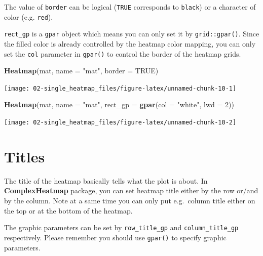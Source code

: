\documentclass[]{book}
\newenvironment{Shaded}{\begin{snugshade}}{\end{snugshade}}
\newcommand{\KeywordTok}[1]{\textcolor[rgb]{0.13,0.29,0.53}{\textbf{#1}}}
\newcommand{\DataTypeTok}[1]{\textcolor[rgb]{0.13,0.29,0.53}{#1}}
\newcommand{\DecValTok}[1]{\textcolor[rgb]{0.00,0.00,0.81}{#1}}
\newcommand{\StringTok}[1]{\textcolor[rgb]{0.31,0.60,0.02}{#1}}
\newcommand{\OtherTok}[1]{\textcolor[rgb]{0.56,0.35,0.01}{#1}}
\newcommand{\NormalTok}[1]{#1}
\theoremstyle{definition}
\theoremstyle{definition}
\theoremstyle{definition}
\theoremstyle{remark}
\begin{document}
The value of \texttt{border} can be logical (\texttt{TRUE} corresponds
to \texttt{black}) or a character of color (e.g. \texttt{red}).

\texttt{rect\_gp} is a \texttt{gpar} object which means you can only set
it by \texttt{grid::gpar()}. Since the filled color is already
controlled by the heatmap color mapping, you can only set the
\texttt{col} parameter in \texttt{gpar()} to control the border of the
heatmap grids.

\begin{Shaded}
\begin{Highlighting}[]
\KeywordTok{Heatmap}\NormalTok{(mat, }\DataTypeTok{name =} \StringTok{"mat"}\NormalTok{, }\DataTypeTok{border =} \OtherTok{TRUE}\NormalTok{)}
\end{Highlighting}
\end{Shaded}

\begin{center}\texttt{[image: 02-single\_heatmap\_files/figure-latex/unnamed-chunk-10-1]} \end{center}

\begin{Shaded}
\begin{Highlighting}[]
\KeywordTok{Heatmap}\NormalTok{(mat, }\DataTypeTok{name =} \StringTok{"mat"}\NormalTok{, }\DataTypeTok{rect_gp =} \KeywordTok{gpar}\NormalTok{(}\DataTypeTok{col =} \StringTok{"white"}\NormalTok{, }\DataTypeTok{lwd =} \DecValTok{2}\NormalTok{))}
\end{Highlighting}
\end{Shaded}

\begin{center}\texttt{[image: 02-single\_heatmap\_files/figure-latex/unnamed-chunk-10-2]} \end{center}

\section{Titles}\label{heatmap-titles}

The title of the heatmap basically tells what the plot is about. In
\textbf{ComplexHeatmap} package, you can set heatmap title either by the
row or/and by the column. Note at a same time you can only put
e.g.~column title either on the top or at the bottom of the heatmap.

The graphic parameters can be set by \texttt{row\_title\_gp} and
\texttt{column\_title\_gp} respectively. Please remember you should use
\texttt{gpar()} to specify graphic parameters.
\end{document}

